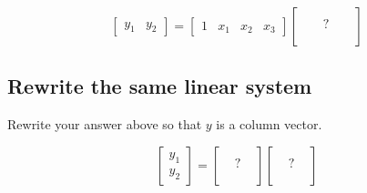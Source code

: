 \documentclass[11pt]{article}
\begin{document}
\begin{equation}
    \begin{bmatrix}
        y_1 &  y_2 
    \end{bmatrix}
    = 
    \begin{bmatrix}
        1 & x_1 & x_2 & x_3
    \end{bmatrix}
    \begin{bmatrix}
        & & & &  \\ 
        & & ? & & \\
        & & & &   \\ 
    \end{bmatrix}
\end{equation}


\subsection{ Rewrite the same linear system }

Rewrite your answer above so that $y$ is a column vector.

\begin{equation}
    \begin{bmatrix}
        y_1 \\  y_2 
    \end{bmatrix}
    = 
    \begin{bmatrix}
         & &  \\ 
         & ? & \\
         & &  \\ 
    \end{bmatrix}
    \begin{bmatrix}
         & &  \\ 
         & ? & \\
         & &  \\ 
    \end{bmatrix}
\end{equation}
\end{document}
